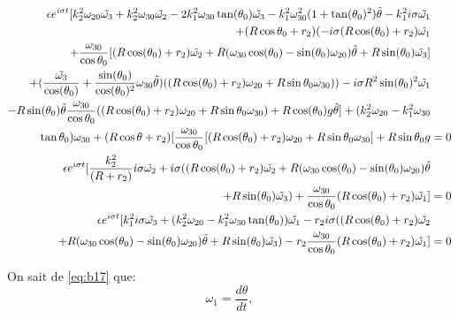 \begin{align}
    \epsilon e^{i \sigma t} [k_2^2 \omega_{20} \tilde{\omega_3}+k_2^2 \omega_{30} \tilde{\omega_2} -2k_1^2\omega_{30} \tan(\theta_0)\tilde{\omega_3}
    -k_1^2 \omega_{30}^2(1+\tan(\theta_0)^2)\tilde{\theta} -k_1^2 i \sigma \Tilde{\omega_1} &\nonumber\\
    +(R\cos{\theta_0}+r_2)(-i \sigma( R\cos(\theta_0)+r_2) \Tilde{\omega_1}& \nonumber \\
    +\frac{\omega_{30}}{\cos{\theta_0}} [(R\cos(\theta_0)+r_2) \Tilde{\omega_2} 
    +R(\omega_{30}\cos(\theta_0)-\sin(\theta_0)\omega_{20}) \Tilde{\theta}
    +R\sin(\theta_0) \Tilde{\omega_3} ] & \nonumber \\
    + (\frac{\tilde{\omega_3}}{\cos(\theta_0)}+\frac{\sin(\theta_0)}{\cos(\theta_0)^2}\omega_{30}\tilde{\theta})((R\cos(\theta_0)+r_2)\omega_{20}
    +R \sin{\theta_0}\omega_{30}) )-i \sigma R^2 \sin(\theta_0)^2 \Tilde{\omega_1}& \nonumber \\
    -R\sin(\theta_0)\tilde{\theta}\frac{\omega_{30}}{\cos{\theta_0}}  ((R\cos(\theta_0)+r_2)\omega_{20}+R \sin{\theta_0}\omega_{30})+R\cos(\theta_0)g\tilde{\theta}]+ (k_2^2\omega_{20}-k_1^2\omega_{30}& \nonumber \\
    \tan{\theta_0})\omega_{30}+(R\cos{\theta}+r_2)[
     \frac{\omega_{30}}{\cos{\theta_0}}  [(R\cos(\theta_0)+r_2)\omega_{20}+R \sin{\theta_0}\omega_{30}]+ R\sin{\theta_0}g &=0  \nonumber\\
     \epsilon e^{i \sigma t}[\frac{k_2^2}{(R+r_2)} i \sigma \Tilde{\omega_2}+i \sigma((R\cos(\theta_0)+r_2) \Tilde{\omega_2} +R(\omega_{30}\cos(\theta_0)-\sin(\theta_0)\omega_{20}) \Tilde{\theta}& \nonumber \\
     +R\sin(\theta_0) \Tilde{\omega_3})
    +\frac{\omega_{30}}{\cos{\theta_0}} (R\cos(\theta_0)+r_2) \Tilde{\omega_1}]  &= 0 \nonumber\\
    \epsilon e^{i \sigma t} [k_1^2 i \sigma\Tilde{\omega_3}+ (k_2^2\omega_{20}-k_1^2\omega_{30} \tan(\theta_0)) \Tilde{\omega_1} -r_2 i \sigma ((R\cos(\theta_0)+r_2) \Tilde{\omega_2} &\nonumber\\
    +R(\omega_{30}\cos(\theta_0)-\sin(\theta_0)\omega_{20}) \Tilde{\theta}+R\sin(\theta_0) \Tilde{\omega_3} )- r_2\frac{\omega_{30}}{\cos{\theta_0}} (R\cos(\theta_0)+r_2) \Tilde{\omega_1}] &= 0
  \label{eq:b23b}
\end{align}


On sait de \ref{eq:b17} que:
\begin{equation}
    \omega_1=\frac{d \theta}{dt},
\end{equation}

